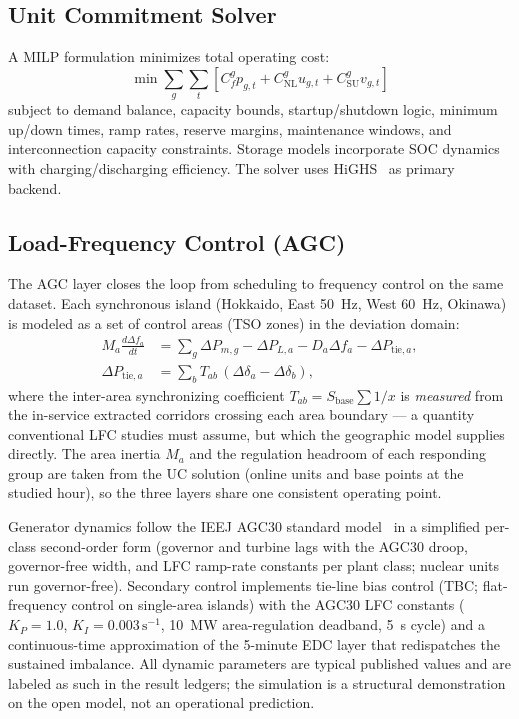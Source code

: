 \documentclass[journal]{IEEEtran}
\begin{document}
\subsection{Unit Commitment Solver}
A MILP formulation minimizes total operating cost:
\begin{equation}
  \min \sum_{g}\sum_{t} \left[ C_f^g p_{g,t} + C_\text{NL}^g u_{g,t} + C_\text{SU}^g v_{g,t} \right]
  \label{eq:uc_obj}
\end{equation}
subject to demand balance, capacity bounds, startup/shutdown logic, minimum up/down times, ramp rates, reserve margins, maintenance windows, and interconnection capacity constraints. Storage models incorporate SOC dynamics with charging/discharging efficiency. The solver uses HiGHS~\cite{highs} as primary backend.

\subsection{Load-Frequency Control (AGC)}
The AGC layer closes the loop from scheduling to frequency control on the same dataset. Each synchronous island (Hokkaido, East 50~Hz, West 60~Hz, Okinawa) is modeled as a set of control areas (TSO zones) in the deviation domain:
\begin{align}
  M_a \frac{d\Delta f_a}{dt} &= \sum_g \Delta P_{m,g} - \Delta P_{L,a} - D_a \Delta f_a - \Delta P_{\text{tie},a}, \label{eq:lfc_swing}\\
  \Delta P_{\text{tie},a} &= \textstyle\sum_b T_{ab}\,(\Delta\delta_a - \Delta\delta_b),
  \label{eq:lfc_tie}
\end{align}
where the inter-area synchronizing coefficient $T_{ab} = S_\text{base}\sum 1/x$ is \emph{measured} from the in-service extracted corridors crossing each area boundary --- a quantity conventional LFC studies must assume, but which the geographic model supplies directly. The area inertia $M_a$ and the regulation headroom of each responding group are taken from the UC solution (online units and base points at the studied hour), so the three layers share one consistent operating point.

Generator dynamics follow the IEEJ AGC30 standard model~\cite{ieej_agc30} in a simplified per-class second-order form (governor and turbine lags with the AGC30 droop, governor-free width, and LFC ramp-rate constants per plant class; nuclear units run governor-free). Secondary control implements tie-line bias control (TBC; flat-frequency control on single-area islands) with the AGC30 LFC constants ($K_P=1.0$, $K_I=0.003\,\mathrm{s}^{-1}$, 10~MW area-regulation deadband, 5~s cycle) and a continuous-time approximation of the 5-minute EDC layer that redispatches the sustained imbalance. All dynamic parameters are typical published values and are labeled as such in the result ledgers; the simulation is a structural demonstration on the open model, not an operational prediction.
\end{document}

